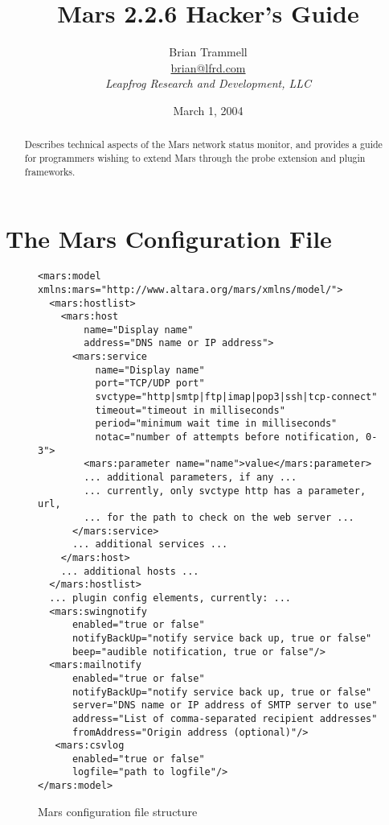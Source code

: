 \documentclass{article}
\title{Mars 2.2.6 Hacker's Guide}
\author{Brian Trammell\\
\url{brian@lfrd.com}\\
{\small \sl Leapfrog Research and Development, LLC}}
\date{March 1, 2004}
\begin{document}
\sloppy
\maketitle

\begin{abstract}
Describes technical aspects of the Mars network status monitor, and provides a
guide for programmers wishing to extend Mars through the probe extension and
plugin frameworks.
\end{abstract}

\tableofcontents

\section{The Mars Configuration File}
\label{sec_marsconfig}
\begin{center}
\begin{figure*}
\begin{verbatim}
<mars:model xmlns:mars="http://www.altara.org/mars/xmlns/model/">  
  <mars:hostlist>  
    <mars:host
        name="Display name"
        address="DNS name or IP address">
      <mars:service
          name="Display name"
          port="TCP/UDP port"
          svctype="http|smtp|ftp|imap|pop3|ssh|tcp-connect"
          timeout="timeout in milliseconds"
          period="minimum wait time in milliseconds"
          notac="number of attempts before notification, 0-3">
        <mars:parameter name="name">value</mars:parameter>
        ... additional parameters, if any ...
        ... currently, only svctype http has a parameter, url, 
        ... for the path to check on the web server ...
      </mars:service>
      ... additional services ...
    </mars:host>
    ... additional hosts ...
  </mars:hostlist>
  ... plugin config elements, currently: ...
  <mars:swingnotify
      enabled="true or false"
      notifyBackUp="notify service back up, true or false"
      beep="audible notification, true or false"/>
  <mars:mailnotify
      enabled="true or false"
      notifyBackUp="notify service back up, true or false"
      server="DNS name or IP address of SMTP server to use"
      address="List of comma-separated recipient addresses"
      fromAddress="Origin address (optional)"/>
   <mars:csvlog
      enabled="true or false"
      logfile="path to logfile"/>
</mars:model>
\end{verbatim}
\caption{Mars configuration file structure}
\label{fig_marsconfig}
\end{figure*}
\end{center}
\end{document}
